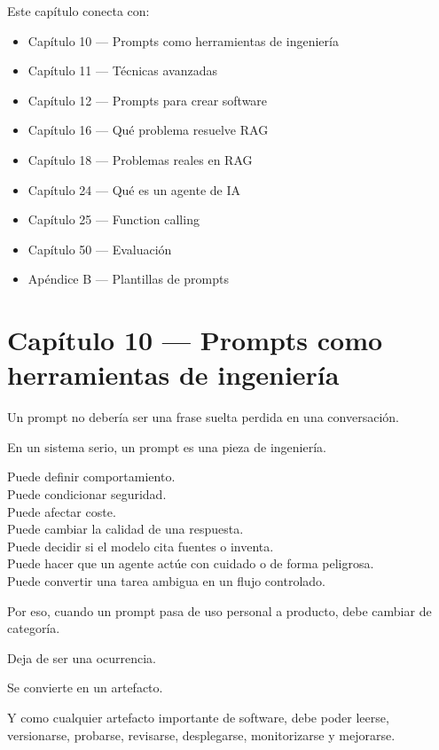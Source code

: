 Este capítulo conecta con:

\begin{itemize}
\tightlist
\item
  Capítulo 10 --- Prompts como herramientas de ingeniería
\item
  Capítulo 11 --- Técnicas avanzadas
\item
  Capítulo 12 --- Prompts para crear software
\item
  Capítulo 16 --- Qué problema resuelve RAG
\item
  Capítulo 18 --- Problemas reales en RAG
\item
  Capítulo 24 --- Qué es un agente de IA
\item
  Capítulo 25 --- Function calling
\item
  Capítulo 50 --- Evaluación
\item
  Apéndice B --- Plantillas de prompts
\end{itemize}

\newpage

\chapter{Capítulo 10 --- Prompts como herramientas de
ingeniería}\label{capuxedtulo-10-prompts-como-herramientas-de-ingenieruxeda}

Un prompt no debería ser una frase suelta perdida en una conversación.

En un sistema serio, un prompt es una pieza de ingeniería.

Puede definir comportamiento.\\
Puede condicionar seguridad.\\
Puede afectar coste.\\
Puede cambiar la calidad de una respuesta.\\
Puede decidir si el modelo cita fuentes o inventa.\\
Puede hacer que un agente actúe con cuidado o de forma peligrosa.\\
Puede convertir una tarea ambigua en un flujo controlado.

Por eso, cuando un prompt pasa de uso personal a producto, debe cambiar
de categoría.

Deja de ser una ocurrencia.

Se convierte en un artefacto.

Y como cualquier artefacto importante de software, debe poder leerse,
versionarse, probarse, revisarse, desplegarse, monitorizarse y
mejorarse.

